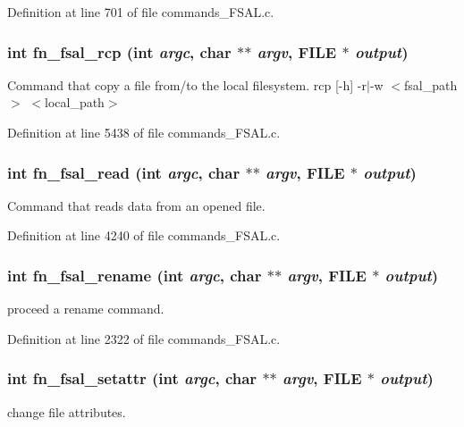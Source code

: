 Definition at line 701 of file commands\_\-FSAL.c.
\subsubsection[{fn\_\-fsal\_\-rcp}]{\setlength{\rightskip}{0pt plus 5cm}int fn\_\-fsal\_\-rcp (int {\em argc}, \/  char $\ast$$\ast$ {\em argv}, \/  FILE $\ast$ {\em output})}\label{commands__FSAL_8c_a187b923de1fe342ff5e352bbb41acbbe}
Command that copy a file from/to the local filesystem. rcp [-\/h] -\/r$|$-\/w $<$fsal\_\-path$>$ $<$local\_\-path$>$ 

Definition at line 5438 of file commands\_\-FSAL.c.
\subsubsection[{fn\_\-fsal\_\-read}]{\setlength{\rightskip}{0pt plus 5cm}int fn\_\-fsal\_\-read (int {\em argc}, \/  char $\ast$$\ast$ {\em argv}, \/  FILE $\ast$ {\em output})}\label{commands__FSAL_8c_a35036b2c35ca5d8d4c69fe777b3bf61a}
Command that reads data from an opened file. 

Definition at line 4240 of file commands\_\-FSAL.c.
\subsubsection[{fn\_\-fsal\_\-rename}]{\setlength{\rightskip}{0pt plus 5cm}int fn\_\-fsal\_\-rename (int {\em argc}, \/  char $\ast$$\ast$ {\em argv}, \/  FILE $\ast$ {\em output})}\label{commands__FSAL_8c_af1fab75db40fed8f10b568eaa2e1ee83}
proceed a rename command. 

Definition at line 2322 of file commands\_\-FSAL.c.
\subsubsection[{fn\_\-fsal\_\-setattr}]{\setlength{\rightskip}{0pt plus 5cm}int fn\_\-fsal\_\-setattr (int {\em argc}, \/  char $\ast$$\ast$ {\em argv}, \/  FILE $\ast$ {\em output})}\label{commands__FSAL_8c_a64ebfd92fc63b2660ade0d2986941ad0}
change file attributes. 

